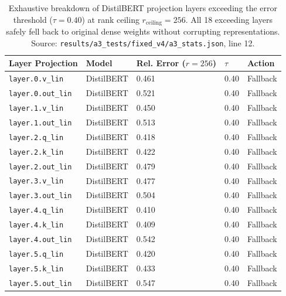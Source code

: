 \begin{table}[H]
\centering
\scriptsize
\setlength{\tabcolsep}{3pt}
\begin{tabular}{p{}p{}p{}p{}p{}}
\toprule
\textbf{Layer Projection} & \textbf{Model} & \textbf{Rel. Error ($r=256$)} & \textbf{$\tau$} & \textbf{Action} \\
\midrule
\texttt{layer.0.v\_lin} & DistilBERT & 0.461 & 0.40 & Fallback \\
\texttt{layer.0.out\_lin} & DistilBERT & 0.521 & 0.40 & Fallback \\
\texttt{layer.1.v\_lin} & DistilBERT & 0.450 & 0.40 & Fallback \\
\texttt{layer.1.out\_lin} & DistilBERT & 0.513 & 0.40 & Fallback \\
\texttt{layer.2.q\_lin} & DistilBERT & 0.418 & 0.40 & Fallback \\
\texttt{layer.2.k\_lin} & DistilBERT & 0.422 & 0.40 & Fallback \\
\texttt{layer.2.out\_lin} & DistilBERT & 0.479 & 0.40 & Fallback \\
\texttt{layer.3.v\_lin} & DistilBERT & 0.477 & 0.40 & Fallback \\
\texttt{layer.3.out\_lin} & DistilBERT & 0.504 & 0.40 & Fallback \\
\texttt{layer.4.q\_lin} & DistilBERT & 0.410 & 0.40 & Fallback \\
\texttt{layer.4.k\_lin} & DistilBERT & 0.409 & 0.40 & Fallback \\
\texttt{layer.4.out\_lin} & DistilBERT & 0.542 & 0.40 & Fallback \\
\texttt{layer.5.q\_lin} & DistilBERT & 0.420 & 0.40 & Fallback \\
\texttt{layer.5.k\_lin} & DistilBERT & 0.433 & 0.40 & Fallback \\
\texttt{layer.5.out\_lin} & DistilBERT & 0.547 & 0.40 & Fallback \\
\bottomrule
\end{tabular}
\caption{Exhaustive breakdown of DistilBERT projection layers exceeding the error threshold ($\tau = 0.40$) at rank ceiling $r_{\mathrm{ceiling}}=256$. All 18 exceeding layers safely fell back to original dense weights without corrupting representations. Source: \texttt{results/a3\_tests/fixed\_v4/a3\_stats.json}, line 12.}
\label{tab:app_failure_cases}
\end{table}